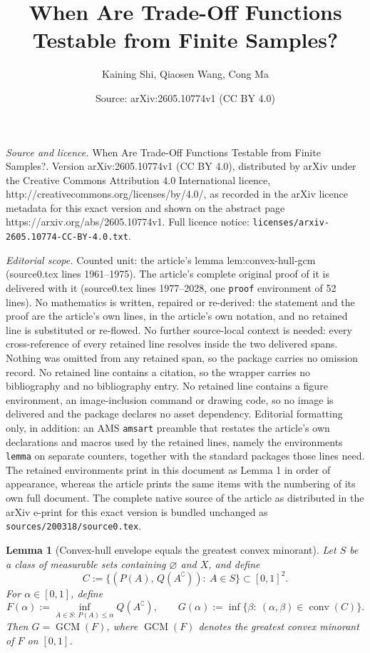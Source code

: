 \documentclass[10pt,a4paper]{amsart}
\title{When Are Trade-Off Functions Testable from Finite Samples?}
\author{Kaining Shi, Qiaosen Wang, Cong Ma}
\date{Source: arXiv:2605.10774v1 (CC BY 4.0)}
\newtheorem{lemma}{Lemma}
\begin{document}
\maketitle

\noindent\emph{Source and licence.} When Are Trade-Off Functions Testable from Finite Samples?. Version arXiv:2605.10774v1 (CC BY 4.0), distributed by arXiv under the Creative Commons Attribution 4.0 International licence, http://creativecommons.org/licenses/by/4.0/, as recorded in the arXiv licence metadata for this exact version and shown on the abstract page https://arxiv.org/abs/2605.10774v1. Full licence notice: \texttt{licenses/arxiv-2605.10774-CC-BY-4.0.txt}.\par\smallskip

\noindent\textit{Editorial scope.} Counted unit: the article's lemma lem:convex-hull-gcm (source0.tex lines 1961--1975). The article's complete original proof of it is delivered with it (source0.tex lines 1977--2028, one \texttt{proof} environment of 52 lines). No mathematics is written, repaired or re-derived: the statement and the proof are the article's own lines, in the article's own notation, and no retained line is substituted or re-flowed.  No further source-local context is needed: every cross-reference of every retained line resolves inside the two delivered spans.  Nothing was omitted from any retained span, so the package carries no omission record.  No retained line contains a citation, so the wrapper carries no bibliography and no bibliography entry.  No retained line contains a figure environment, an image-inclusion command or drawing code, so no image is delivered and the package declares no asset dependency.  Editorial formatting only, in addition: an AMS \texttt{amsart} preamble that restates the article's own declarations and macros used by the retained lines, namely the environments \texttt{lemma} on separate counters, together with the standard packages those lines need.  The retained environments print in this document as Lemma 1 in order of appearance, whereas the article prints the same items with the numbering of its own full document.  The complete native source of the article as distributed in the arXiv e-print for this exact version is bundled unchanged as \texttt{sources/200318/source0.tex}.
\begin{lemma}[Convex-hull envelope equals the greatest convex minorant]
\label{lem:convex-hull-gcm}
Let $S$ be a class of measurable sets containing $\varnothing$ and $X$, and define
\[
C:=\{(P(A),\,Q(A^{\complement})):\ A\in S\}\subset [0,1]^2.
\]
For $\alpha\in[0,1]$, define
\[
F(\alpha):=\inf_{A\in S:\,P(A)\leqslant \alpha} Q(A^{\complement}),
\qquad
G(\alpha):=\inf\{\beta:\ (\alpha,\beta)\in \operatorname{conv}(C)\}.
\]
Then $G=\operatorname{GCM}(F)$, 
where $\operatorname{GCM}(F)$ denotes the greatest convex minorant of $F$ on $[0,1]$.
\end{lemma}
\end{document}
